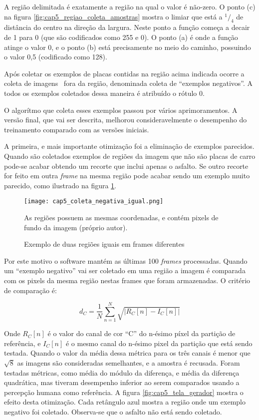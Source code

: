 A região delimitada é exatamente a região na qual o valor é não-zero. O ponto
(c) na figura \ref{fig:cap5_regiao_coleta_amostras} mostra o limiar que está
a $^1/_4$ de distância do centro na direção da largura. Neste ponto a função
começa a decair de 1 para 0 (que são codificados como 255 e 0). O ponto (a)
é onde a função atinge o valor 0, e o ponto (b) está precisamente no
meio do caminho, possuindo o valor 0,5 (codificado como 128).

Após coletar os exemplos de placas contidas na região acima indicada ocorre a
coleta de imagens  fora da região, denominada coleta de “exemplos negativos”. A
todos os exemplos coletados dessa maneira é atribuído o rótulo 0.

O algorítmo que coleta esses exemplos passou por vários aprimoramentos. A
versão final, que vai ser descrita, melhorou consideravelmente o desempenho do
treinamento comparado com as versões iniciais.

A primeira, e mais importante otimização foi a eliminação de exemplos
parecidos. Quando são coletados exemplos de regiões da imagem que não são
placas de carro pode-se acabar obtendo um recorte que inclui apenas o asfalto.
Se outro recorte for feito em outra \emph{frame} na mesma região pode acabar
sendo um exemplo muito parecido, como ilustrado na figura
\ref{fig:cap5_coleta_negativa_igual}.

\begin{figure}[!htb]
	\centering
	\texttt{[image: cap5\_coleta\_negativa\_igual.png]}
	\caption{Exemplo de duas regiões iguais em frames diferentes}
	\label{fig:cap5_coleta_negativa_igual}
	As regiões possuem as mesmas coordenadas, e contém pixels de fundo da
	imagem (próprio autor).
\end{figure}

Por este motivo o software mantém as últimas 100 \emph{frames} processadas.
Quando um “exemplo negativo” vai ser coletado em uma região a imagem é
comparada com os
pixels da mesma região nestas frames que foram armazenadas. O critério de
comparação é:

\begin{equation}
	d_C=\frac{1}{N} \sum_{n=1}^N \sqrt{\left| R_C [n] -I_C [n] \right|}
\end{equation}

Onde $R_C[n]$ é o valor do canal de cor “C” do n-ésimo píxel da partição de
referência, e $I_C[n]$ é o mesmo canal do n-ésimo pixel da
partição que está sendo testada. Quando o valor da média dessa métrica
para os três canais é menor que $\sqrt{8}$ as imagens são consideradas
semelhantes, e a amostra é recusada. Foram
testadas métricas, como média do módulo da diferença, e média da diferença
quadrática, mas tiveram desempenho inferior ao serem comparados usando a
percepção humana como referência. A figura
\ref{fig:cap5_tela_gerador} mostra o efeito desta otimização.
Cada retângulo azul mostra a região onde um exemplo negativo foi coletado.
Observa-se que o asfalto não está sendo coletado.

